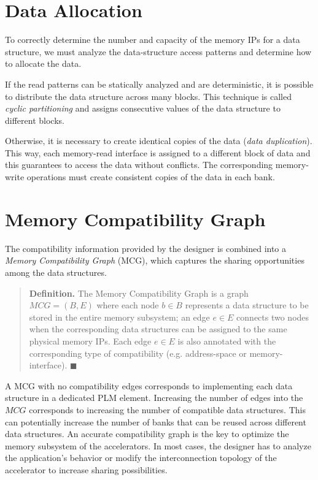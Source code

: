 \section{Data Allocation}

To correctly determine the number and capacity of the memory IPs for a
data structure, we must analyze the data-structure access
patterns and determine how to allocate the data.

If the read patterns can be statically analyzed and are deterministic,
it is possible to distribute the data structure across many
blocks. This technique is called \textit{cyclic partitioning} and
assigns consecutive values of the data structure to different blocks.

Otherwise, it is necessary to create identical copies of the data
({\em data duplication}). This way, each memory-read interface is
assigned to a different block of data and this guarantees to access
the data without conflicts. The corresponding memory-write operations
must create consistent copies of the data in each bank.

\section{Memory Compatibility Graph}

The compatibility information provided by the designer is combined into a
\textit{Memory Compatibility Graph} (MCG), which captures the sharing
opportunities among the data structures.
\begin{quote}
{
\small
{\bf Definition.}
The Memory Compatibility Graph is a graph $MCG=(B,E)$ where each node $b
\in B$ represents a data structure to be stored in the entire memory subsystem;
an edge $e \in E$ connects two nodes when the corresponding data
structures can be assigned to the same physical memory IPs. Each edge $e \in E$
is also annotated with the corresponding type of compatibility (e.g.
address-space or memory-interface).
\hfill $\blacksquare$
}
\end{quote}
%
A MCG with no compatibility edges corresponds to implementing each
data structure in a dedicated PLM element.
Increasing the number of edges into the $MCG$ corresponds to increasing the
number of compatible data structures. This can potentially increase the number
of banks that can be reused across different data structures.
An accurate compatibility graph is the key to optimize the memory subsystem of
the accelerators. In most cases, the designer has to analyze the application's
behavior or modify the interconnection topology of the accelerator to increase
sharing possibilities.
